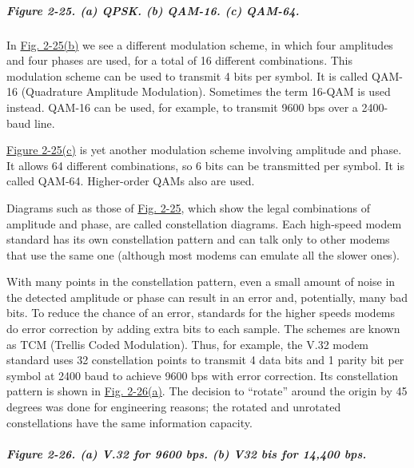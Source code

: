 \subparagraph[Figure 2-25. (a) QPSK. (b) QAM-16. (c)
QAM-64.]{\texorpdfstring{\protect\hypertarget{0130661023_ch02lev1sec5.htmlux5cux23ch02fig25}{}{}Figure
2-25. (a) QPSK. (b) QAM-16. (c)
QAM-64.}{Figure 2-25. (a) QPSK. (b) QAM-16. (c) QAM-64.}}


In
\protect\hyperlink{0130661023_ch02lev1sec5.htmlux5cux23ch02fig25}{Fig.
2-25(b)} we see a different modulation scheme, in which four amplitudes
and four phases are used, for a total of 16 different combinations. This
modulation scheme can be used to transmit 4 bits per symbol. It is
called {QAM-16} ({Quadrature Amplitude Modulation}). Sometimes the term
{16-QAM} is used instead. QAM-16 can be used, for example, to transmit
9600 bps over a 2400-baud line.

\protect\hyperlink{0130661023_ch02lev1sec5.htmlux5cux23ch02fig25}{Figure
2-25(c)} is yet another modulation scheme involving amplitude and phase.
It allows 64 different combinations, so 6 bits can be transmitted per
symbol. It is called {QAM-64}. Higher-order QAMs also are used.

Diagrams such as those of
\protect\hyperlink{0130661023_ch02lev1sec5.htmlux5cux23ch02fig25}{Fig.
2-25}, which show the legal combinations of amplitude and phase, are
called {constellation diagrams}. Each high-speed modem standard has its
own constellation pattern and can talk only to other modems that use the
same one (although most modems can emulate all the slower ones).

With many points in the constellation pattern, even a small amount of
noise in the detected amplitude or phase can result in an error and,
potentially, many bad bits. To reduce the chance of an error, standards
for the higher speeds modems do error correction by adding extra bits to
each sample. The schemes are known as {TCM} ({Trellis Coded
Modulation}). Thus, for example, the V.32 modem standard uses 32
constellation points to transmit 4 data bits and 1 parity bit per symbol
at 2400 baud to achieve 9600 bps with error correction. Its
constellation pattern is shown in
\protect\hyperlink{0130661023_ch02lev1sec5.htmlux5cux23ch02fig26}{Fig.
2-26(a)}. The decision to ``rotate'' around the origin by 45 degrees was
done for engineering reasons; the rotated and unrotated constellations
have the same information capacity.

\subparagraph[Figure 2-26. (a) V.32 for 9600 bps. (b) V32 bis for 14,400
bps.]{\texorpdfstring{\protect\hypertarget{0130661023_ch02lev1sec5.htmlux5cux23ch02fig26}{}{}Figure
2-26. (a) V.32 for 9600 bps. (b) V32 bis for 14,400
bps.}{Figure 2-26. (a) V.32 for 9600 bps. (b) V32 bis for 14,400 bps.}}

